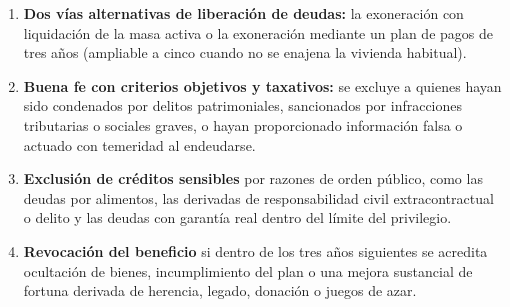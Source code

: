 \documentclass[12pt,oneside]{book}
\begin{document}
\begin{enumerate}[label=(\alph*)]
    \item \textbf{Dos vías alternativas de liberación de deudas:} la exoneración con liquidación de la masa activa o la exoneración mediante un plan de pagos de tres años (ampliable a cinco cuando no se enajena la vivienda habitual).
    \item \textbf{Buena fe con criterios objetivos y taxativos:} se excluye a quienes hayan sido condenados por delitos patrimoniales, sancionados por infracciones tributarias o sociales graves, o hayan proporcionado información falsa o actuado con temeridad al endeudarse.
    \item \textbf{Exclusión de créditos sensibles} por razones de orden público, como las deudas por alimentos, las derivadas de responsabilidad civil extracontractual o delito y las deudas con garantía real dentro del límite del privilegio.
    \item \textbf{Revocación del beneficio} si dentro de los tres años siguientes se acredita ocultación de bienes, incumplimiento del plan o una mejora sustancial de fortuna derivada de herencia, legado, donación o juegos de azar.
\end{enumerate}
\end{document}
